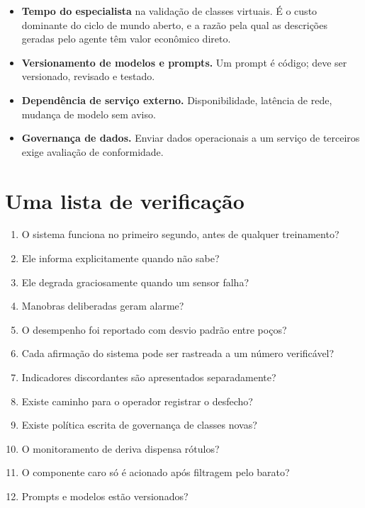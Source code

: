 \begin{itemize}[leftmargin=*,itemsep=0.3em]
  \item \textbf{Tempo do especialista} na validação de classes virtuais. É o custo
        dominante do ciclo de mundo aberto, e a razão pela qual as descrições geradas
        pelo agente têm valor econômico direto.
  \item \textbf{Versionamento de modelos e prompts.} Um prompt é código; deve ser
        versionado, revisado e testado.
  \item \textbf{Dependência de serviço externo.} Disponibilidade, latência de rede,
        mudança de modelo sem aviso.
  \item \textbf{Governança de dados.} Enviar dados operacionais a um serviço de terceiros
        exige avaliação de conformidade.
\end{itemize}

\section{Uma lista de verificação}

\begin{enumerate}[leftmargin=*,itemsep=0.3em]
  \item O sistema funciona no primeiro segundo, antes de qualquer treinamento?
  \item Ele informa explicitamente quando não sabe?
  \item Ele degrada graciosamente quando um sensor falha?
  \item Manobras deliberadas geram alarme?
  \item O desempenho foi reportado com desvio padrão entre poços?
  \item Cada afirmação do sistema pode ser rastreada a um número verificável?
  \item Indicadores discordantes são apresentados separadamente?
  \item Existe caminho para o operador registrar o desfecho?
  \item Existe política escrita de governança de classes novas?
  \item O monitoramento de deriva dispensa rótulos?
  \item O componente caro só é acionado após filtragem pelo barato?
  \item Prompts e modelos estão versionados?
\end{enumerate}

